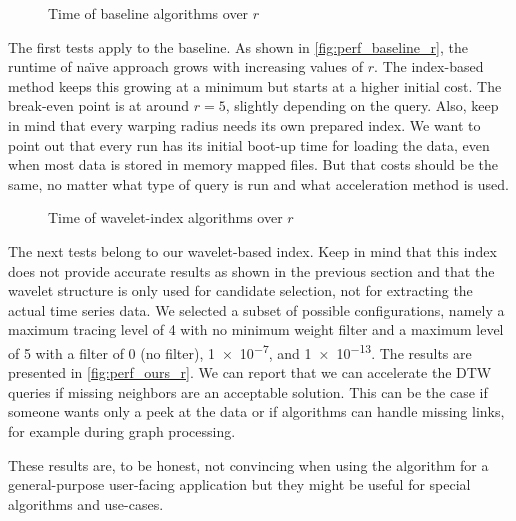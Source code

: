 \begin{figure}
    \centering
    
    \caption{Time of baseline algorithms over $r$}\label{fig:perf_baseline_r}
\end{figure}

The first tests apply to the baseline. As shown in \autoref{fig:perf_baseline_r}, the runtime of na{\"\i}ve approach grows with increasing values of $r$. The index-based method keeps this growing at a minimum but starts at a higher initial cost. The break-even point is at around $r = 5$, slightly depending on the query. Also, keep in mind that every warping radius needs its own prepared index. We want to point out that every run has its initial boot-up time for loading the data, even when most data is stored in memory mapped files. But that costs should be the same, no matter what type of query is run and what acceleration method is used.

\begin{figure}
    \centering
    
    \caption{Time of wavelet-index algorithms over $r$}\label{fig:perf_ours_r}
\end{figure}

The next tests belong to our wavelet-based index. Keep in mind that this index does not provide accurate results as shown in the previous section and that the wavelet structure is only used for candidate selection, not for extracting the actual time series data. We selected a subset of possible configurations, namely a maximum tracing level of \num{4} with no minimum weight filter and a maximum level of \num{5} with a filter of \num{0} (no filter), \num{1e-7}, and \num{1e-13}. The results are presented in \autoref{fig:perf_ours_r}. We can report that we can accelerate the DTW queries if missing neighbors are an acceptable solution. This can be the case if someone wants only a peek at the data or if algorithms can handle missing links, for example during graph processing.

These results are, to be honest, not convincing when using the algorithm for a general-purpose user-facing application but they might be useful for special algorithms and use-cases.
